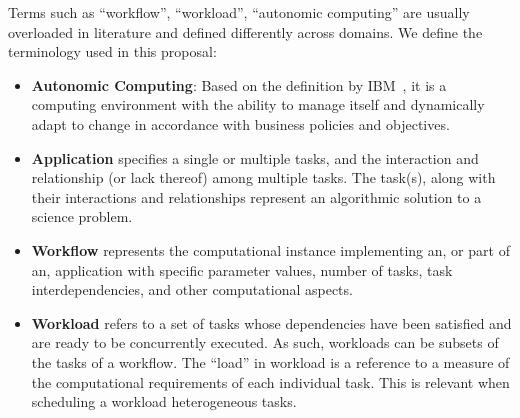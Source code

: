Terms such as ``workflow'', ``workload'', ``autonomic computing'' are usually 
overloaded in literature and defined differently across domains. We define the 
terminology used in this proposal:
\begin{itemize}
    \item \textbf{Autonomic Computing}: Based on the definition by IBM~\cite{ibm2005autonomic}, 
    it is a computing environment with the ability to manage itself and dynamically 
    adapt to change in accordance with business policies and objectives.
    \item \textbf{Application} specifies a single or multiple tasks, and the 
    interaction and relationship (or lack thereof) among multiple tasks. The task(s), 
    along with their interactions and relationships represent an algorithmic solution 
    to a science problem.
    \item \textbf{Workflow} represents the computational instance implementing an, or 
    part of an, application with specific parameter values, number of tasks, task 
    interdependencies, and other computational aspects.
    \item \textbf{Workload} refers to a set of tasks whose dependencies have been satisfied 
    and are ready to be concurrently executed. As such, workloads can be subsets of the 
    tasks of a workflow. The “load” in workload is a reference to a measure of the computational 
    requirements of each individual task. This is relevant when scheduling a workload 
    heterogeneous tasks.
\end{itemize}